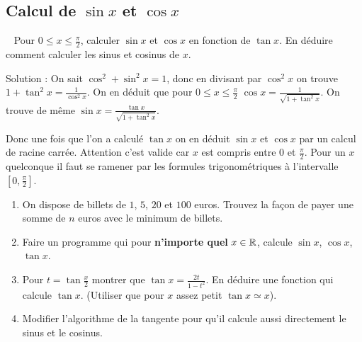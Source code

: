 \documentclass[class=report,crop=false]{standalone}
\begin{document}
\subsection{Calcul de $\sin x$ et $\cos x$}

\begin{tp}~
Pour $0 \le x \le \frac \pi2$, calculer $\sin x$ et $\cos x$ en fonction de $\tan x$.
En déduire comment calculer les sinus et cosinus de $x$.
\end{tp}

Solution :
On sait $\cos^2+\sin^2 x = 1$, donc en divisant par $\cos^2 x$ on trouve
$1+\tan^2 x = \frac{1}{\cos^2 x}$. On en déduit que pour $0 \le x \le \frac \pi2$
$\cos x = \frac{1}{\sqrt{1+\tan^2 x}}$.
On trouve de même $\sin x = \frac{\tan x}{\sqrt{1+\tan^2 x}}$.

Donc une fois que l'on a calculé $\tan x$ on en déduit $\sin x$ et $\cos x$ par un calcul de racine carrée.
Attention c'est valide car $x$ est compris entre $0$ et $\frac \pi2$.
Pour un $x$ quelconque il faut se ramener par les formules trigonométriques à l'intervalle $[0,\frac \pi 2]$.


\begin{miniexercices}
\begin{enumerate}

  \item On dispose de billets de $1$, $5$, $20$ et $100$ euros. Trouvez la façon de payer une somme de
  $n$ euros avec le minimum de billets.

  \item Faire un programme qui pour \textbf{n'importe quel} $x \in \mathbb{R}$, calcule $\sin x$, $\cos x$, $\tan x$.

  \item Pour $t = \tan \frac x2$ montrer que $\tan x = \frac{2t}{1-t^2}$.
  En déduire une fonction qui calcule $\tan x$. (Utiliser que pour $x$ assez petit $\tan x \simeq x$).

  \item Modifier l'algorithme de la tangente pour qu'il calcule aussi directement
  le sinus et le cosinus.

\end{enumerate}
\end{miniexercices}
\end{document}
